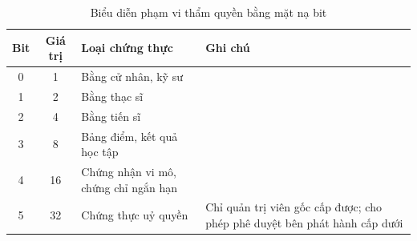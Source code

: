 \begin{table}[H]
\centering
\caption{Biểu diễn phạm vi thẩm quyền bằng mặt nạ bit}
\label{tab:v2-mask}
\renewcommand{\arraystretch}{1.2}
\small
\begin{tabular}{|c|c|p{4.8cm}|p{5.6cm}|}
\hline
\textbf{Bit} & \textbf{Giá trị} & \textbf{Loại chứng thực} & \textbf{Ghi chú} \\ \hline
0 & 1  & Bằng cử nhân, kỹ sư & \\ \hline
1 & 2  & Bằng thạc sĩ & \\ \hline
2 & 4  & Bằng tiến sĩ & \\ \hline
3 & 8  & Bảng điểm, kết quả học tập & \\ \hline
4 & 16 & Chứng nhận vi mô, chứng chỉ ngắn hạn & \\ \hline
5 & 32 & Chứng thực uỷ quyền & Chỉ quản trị viên gốc cấp được; cho phép phê duyệt bên phát hành cấp dưới \\ \hline
\end{tabular}
\end{table}
